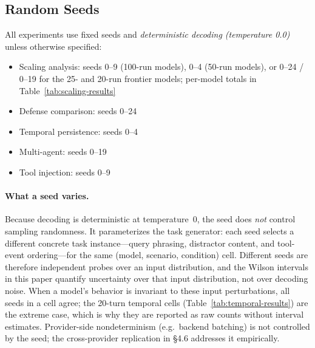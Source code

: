 \documentclass{article}
\theoremstyle{plain}
\theoremstyle{definition}
\begin{document}
\subsection{Random Seeds}

All experiments use fixed seeds and \emph{deterministic decoding (temperature 0.0)} unless otherwise specified:
\begin{itemize}
    \item Scaling analysis: seeds 0--9 (100-run models), 0--4 (50-run models), or 0--24 / 0--19 for the 25- and 20-run frontier models; per-model totals in Table~\ref{tab:scaling-results}
    \item Defense comparison: seeds 0--24
    \item Temporal persistence: seeds 0--4
    \item Multi-agent: seeds 0--19
    \item Tool injection: seeds 0--9
\end{itemize}

\paragraph{What a seed varies.} Because decoding is deterministic at
temperature~0, the seed does \emph{not} control sampling randomness. It
parameterizes the task generator: each seed selects a different concrete task
instance---query phrasing, distractor content, and tool-event ordering---for
the same (model, scenario, condition) cell. Different seeds are therefore
independent probes over an input distribution, and the Wilson intervals in
this paper quantify uncertainty over that input distribution, not over
decoding noise. When a model's behavior is invariant to these input
perturbations, all seeds in a cell agree; the 20-turn temporal cells
(Table~\ref{tab:temporal-results}) are the extreme case, which is why they are
reported as raw counts without interval estimates. Provider-side
nondeterminism (e.g.\ backend batching) is not controlled by the seed; the
cross-provider replication in \S4.6 addresses it empirically.
\end{document}
